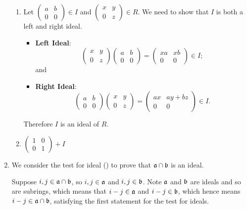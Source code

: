 \begin{enumerate}
\begin{enumerate}[label=(\roman*)]
        \item Let $\begin{pmatrix}a&b\\0&0\end{pmatrix} \in I$ and $\begin{pmatrix}x&y\\0&z\end{pmatrix} \in R$. We need to show that $I$ is both a left and right ideal.
        \begin{itemize}
            \item \textbf{Left Ideal}:
            \[
                \begin{pmatrix}x&y\\0&z\end{pmatrix}\begin{pmatrix}a&b\\0&0\end{pmatrix} = \begin{pmatrix}xa&xb\\0&0\end{pmatrix} \in I;
            \]
            and
            \item \textbf{Right Ideal}: \[
                \begin{pmatrix}a&b\\0&0\end{pmatrix}\begin{pmatrix}x&y\\0&z\end{pmatrix} = \begin{pmatrix}ax&ay+bz\\0&0\end{pmatrix} \in I.
            \]
        \end{itemize}
        Therefore $I$ is an ideal of $R$.

        \item $\begin{pmatrix}1&0\\0&1\end{pmatrix} + I$
    \end{enumerate}

    \item We consider the test for ideal () to prove that $\mathfrak{a}\cap\mathfrak{b}$ is an ideal.
    
    Suppose $i,j\in\mathfrak{a}\cap\mathfrak{b}$, so $i,j \in \mathfrak{a}$ and $i,j \in \mathfrak{b}$. Note $\mathfrak{a}$ and $\mathfrak{b}$ are ideals and so are subrings, which means that $i-j \in \mathfrak{a}$ and $i-j \in \mathfrak{b}$, which hence means $i-j \in \mathfrak{a}\cap\mathfrak{b}$, satisfying the first statement for the test for ideals.


\end{enumerate}
